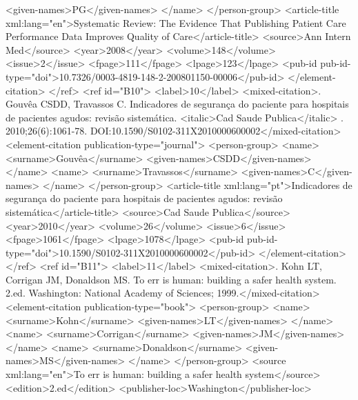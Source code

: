               <given-names>PG</given-names>
            </name>
          </person-group>
          <article-title xml:lang="en">Systematic Review: The Evidence That Publishing Patient Care
            Performance Data Improves Quality of Care</article-title>
          <source>Ann Intern Med</source>
          <year>2008</year>
          <volume>148</volume>
          <issue>2</issue>
          <fpage>111</fpage>
          <lpage>123</lpage>
          <pub-id pub-id-type="doi">10.7326/0003-4819-148-2-200801150-00006</pub-id>
        </element-citation>
      </ref>
      <ref id="B10">
        <label>10</label>
        <mixed-citation>. Gouvêa CSDD, Travassos C. Indicadores de segurança do paciente para
          hospitais de pacientes agudos: revisão sistemática. <italic>Cad Saude Publica</italic> .
          2010;26(6):1061-78. DOI:10.1590/S0102-311X2010000600002</mixed-citation>
        <element-citation publication-type="journal">
          <person-group>
            <name>
              <surname>Gouvêa</surname>
              <given-names>CSDD</given-names>
            </name>
            <name>
              <surname>Travassos</surname>
              <given-names>C</given-names>
            </name>
          </person-group>
          <article-title xml:lang="pt">Indicadores de segurança do paciente para hospitais de
            pacientes agudos: revisão sistemática</article-title>
          <source>Cad Saude Publica</source>
          <year>2010</year>
          <volume>26</volume>
          <issue>6</issue>
          <fpage>1061</fpage>
          <lpage>1078</lpage>
          <pub-id pub-id-type="doi">10.1590/S0102-311X2010000600002</pub-id>
        </element-citation>
      </ref>
      <ref id="B11">
        <label>11</label>
        <mixed-citation>. Kohn LT, Corrigan JM, Donaldson MS. To err is human: building a safer
          health system. 2.ed. Washington: National Academy of Sciences; 1999.</mixed-citation>
        <element-citation publication-type="book">
          <person-group>
            <name>
              <surname>Kohn</surname>
              <given-names>LT</given-names>
            </name>
            <name>
              <surname>Corrigan</surname>
              <given-names>JM</given-names>
            </name>
            <name>
              <surname>Donaldson</surname>
              <given-names>MS</given-names>
            </name>
          </person-group>
          <source xml:lang="en">To err is human: building a safer health system</source>
          <edition>2.ed</edition>
          <publisher-loc>Washington</publisher-loc>
